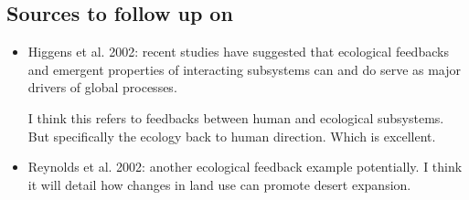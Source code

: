 \documentclass[a4paper,10pt]{report}
\begin{document}
\subsection*{Sources to follow up on}
\begin{itemize}
\item Higgens et al. 2002: recent studies have suggested that ecological feedbacks and emergent properties of interacting subsystems can and do serve as major drivers of global processes. 

I think this refers to feedbacks between human and ecological subsystems. But specifically the ecology back to human direction. Which is excellent.
\item Reynolds  et al. 2002: another ecological feedback example potentially. I think it will detail how changes in land use can promote desert expansion. 
\end{itemize}



\end{document}
